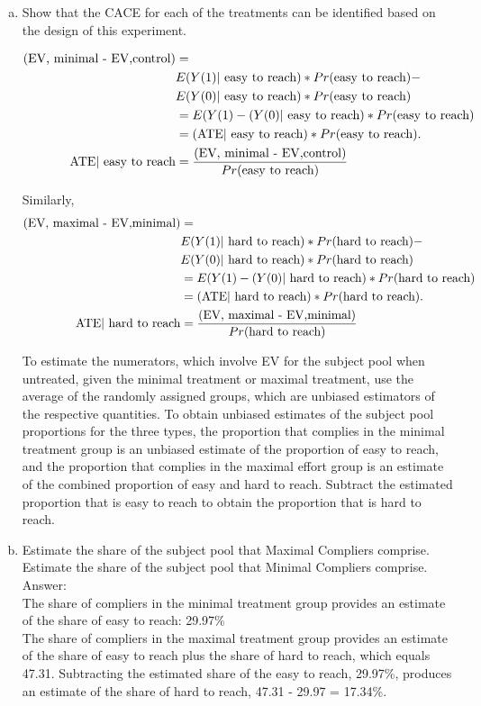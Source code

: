 \documentclass[11pt,notitlepage]{article}\usepackage[]{graphicx}\usepackage[]{color}
\begin{document}
\begin{enumerate}[a)]
\item Show that the CACE for each of the treatments can be identified based on the design of this experiment.

\begin{align*}
\text{(EV, minimal - EV,control)} &= \\
&E(Y(1)|\text{ easy to reach})*Pr(\text{easy to reach}) - \\
&E(Y(0)|\text{ easy to reach})*Pr(\text{easy to reach}) \\
&= E(Y(1) -(Y(0)|\text{ easy to reach})*Pr(\text{easy to reach}) \\
&= (\text{ATE}|\text{ easy to reach})*Pr(\text{easy to reach}). \\
\text{ATE|\text{ easy to reach}} &= \frac{\text{(EV, minimal - EV,control)}}{Pr(\text{easy to reach})}
\end{align*}

Similarly, 
\begin{align*}
\text{(EV, maximal - EV,minimal)} &= \\
&E(Y(1)|\text{ hard to reach})*Pr(\text{hard to reach}) - \\
&E(Y(0)|\text{ hard to reach})*Pr(\text{hard to reach}) \\
&= E(Y(1) -(Y(0)|\text{ hard to reach})*Pr(\text{hard to reach}) \\
&= (\text{ATE}|\text{ hard to reach})*Pr(\text{hard to reach}). \\
\text{ATE|\text{ hard to reach}} &= \frac{\text{(EV, maximal - EV,minimal)}}{Pr(\text{hard to reach})}
\end{align*}

To estimate the numerators, which involve EV for the subject pool when untreated, given the minimal treatment or maximal treatment, use the average of the randomly assigned groups, which are unbiased estimators of the respective quantities.
To obtain unbiased estimates of the subject pool proportions for the three types, the proportion that complies in the minimal treatment group is an unbiased estimate of the proportion of easy to reach, and the proportion that complies in the maximal effort group is an estimate of the combined proportion of easy and hard to reach. Subtract the estimated proportion that is easy to reach to obtain the proportion that is hard to reach.


\item Estimate the share of the subject pool that Maximal Compliers comprise. Estimate the share of the subject pool that Minimal Compliers comprise.\\
Answer:\\
The share of compliers in the minimal treatment group provides an estimate of the share of easy to reach: 29.97\% \\
The share of compliers in the maximal treatment group provides an estimate of the share of easy to reach plus the share of hard to reach, which equals 47.31. Subtracting the estimated share of the easy to reach, 29.97\%, produces an estimate of the share of hard to reach, 47.31 - 29.97 = 17.34\%. 


\end{enumerate}
\end{document}
